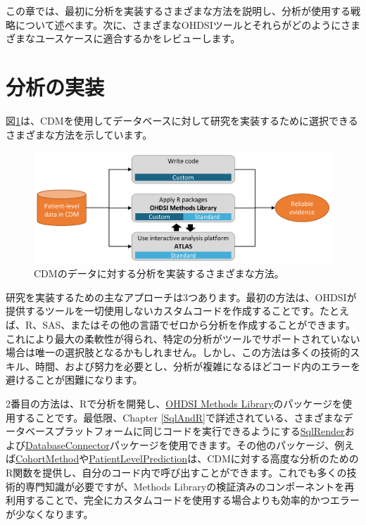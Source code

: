 \documentclass[
  11pt]{book}
\theoremstyle{definition}
\theoremstyle{definition}
\theoremstyle{definition}
\theoremstyle{definition}
\theoremstyle{remark}
\begin{document}
この章では、最初に分析を実装するさまざまな方法を説明し、分析が使用する戦略について述べます。次に、さまざまなOHDSIツールとそれらがどのようにさまざまなユースケースに適合するかをレビューします。

\section{分析の実装}\label{analysisImplementation}

図\ref{fig:implementations}は、CDMを使用してデータベースに対して研究を実装するために選択できるさまざまな方法を示しています。 

\begin{figure}

{\centering \includegraphics[width=0.9\linewidth]{images/OhdsiAnalyticsTools/implementations} 

}

\caption{CDMのデータに対する分析を実装するさまざまな方法。}\label{fig:implementations}
\end{figure}

研究を実装するための主なアプローチは3つあります。最初の方法は、OHDSIが提供するツールを一切使用しないカスタムコードを作成することです。たとえば、R、SAS、またはその他の言語でゼロから分析を作成することができます。これにより最大の柔軟性が得られ、特定の分析がツールでサポートされていない場合は唯一の選択肢となるかもしれません。しかし、この方法は多くの技術的スキル、時間、および努力を必要とし、分析が複雑になるほどコード内のエラーを避けることが困難になります。

2番目の方法は、Rで分析を開発し、\href{https://ohdsi.github.io/MethodsLibrary/}{OHDSI Methods Library}のパッケージを使用することです。最低限、Chapter \ref{SqlAndR}で詳述されている、さまざまなデータベースプラットフォームに同じコードを実行できるようにする\href{https://ohdsi.github.io/SqlRender/}{SqlRender}および\href{https://ohdsi.github.io/DatabaseConnector/}{DatabaseConnector}パッケージを使用できます。その他のパッケージ、例えば\href{https://ohdsi.github.io/CohortMethod/}{CohortMethod}や\href{https://ohdsi.github.io/PatientLevelPrediction/}{PatientLevelPrediction}は、CDMに対する高度な分析のためのR関数を提供し、自分のコード内で呼び出すことができます。これでも多くの技術的専門知識が必要ですが、Methods Libraryの検証済みのコンポーネントを再利用することで、完全にカスタムコードを使用する場合よりも効率的かつエラーが少なくなります。
\end{document}
